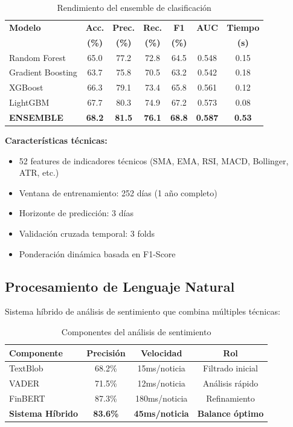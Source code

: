 \documentclass[12pt,a4paper]{article}
\begin{document}
\begin{table}[H]
\centering
\small
\begin{tabular}{lcccccc}
\toprule
\textbf{Modelo} & \textbf{Acc.} & \textbf{Prec.} & \textbf{Rec.} & \textbf{F1} & \textbf{AUC} & \textbf{Tiempo} \\
 & \textbf{(\%)} & \textbf{(\%)} & \textbf{(\%)} & \textbf{(\%)} & & \textbf{(s)} \\
\midrule
Random Forest & 65.0 & 77.2 & 72.8 & 64.5 & 0.548 & 0.15 \\
Gradient Boosting & 63.7 & 75.8 & 70.5 & 63.2 & 0.542 & 0.18 \\
XGBoost & 66.3 & 79.1 & 73.4 & 65.8 & 0.561 & 0.12 \\
LightGBM & 67.7 & 80.3 & 74.9 & 67.2 & 0.573 & 0.08 \\
\midrule
\textbf{ENSEMBLE} & \textbf{68.2} & \textbf{81.5} & \textbf{76.1} & \textbf{68.8} & \textbf{0.587} & \textbf{0.53} \\
\bottomrule
\end{tabular}
\caption{Rendimiento del ensemble de clasificación}
\end{table}

\textbf{Características técnicas:}
\begin{itemize}
    \item 52 features de indicadores técnicos (SMA, EMA, RSI, MACD, Bollinger, ATR, etc.)
    \item Ventana de entrenamiento: 252 días (1 año completo)
    \item Horizonte de predicción: 3 días
    \item Validación cruzada temporal: 3 folds
    \item Ponderación dinámica basada en F1-Score
\end{itemize}

\subsection{Procesamiento de Lenguaje Natural}

Sistema híbrido de análisis de sentimiento que combina múltiples técnicas:

\begin{table}[H]
\centering
\begin{tabular}{lccc}
\toprule
\textbf{Componente} & \textbf{Precisión} & \textbf{Velocidad} & \textbf{Rol} \\
\midrule
TextBlob & 68.2\% & 15ms/noticia & Filtrado inicial \\
VADER & 71.5\% & 12ms/noticia & Análisis rápido \\
FinBERT & 87.3\% & 180ms/noticia & Refinamiento \\
\midrule
\textbf{Sistema Híbrido} & \textbf{83.6\%} & \textbf{45ms/noticia} & \textbf{Balance óptimo} \\
\bottomrule
\end{tabular}
\caption{Componentes del análisis de sentimiento}
\end{table}
\end{document}
